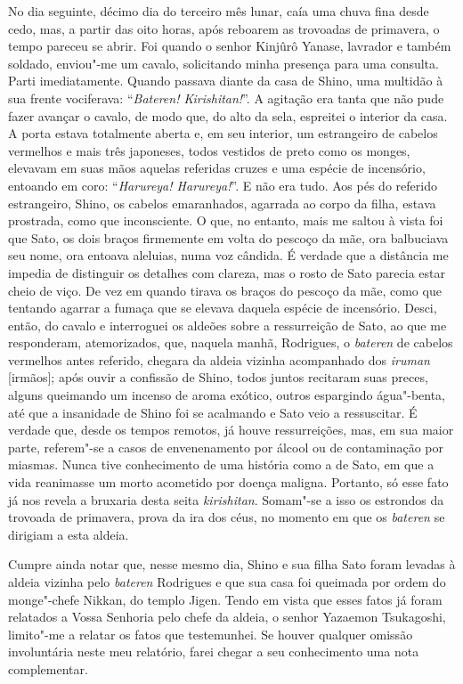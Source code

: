 No dia seguinte, décimo dia do terceiro mês lunar, caía uma chuva fina
desde cedo, mas, a partir das oito horas, após reboarem as trovoadas de
primavera, o tempo pareceu se abrir. Foi quando o senhor Kinjûrô Yanase, 
lavrador e também soldado, enviou"-me um cavalo, solicitando
minha presença para uma consulta. Parti imediatamente. Quando passava
diante da casa de Shino, uma multidão à sua frente vociferava:
``\textit{Bateren! Kirishitan!}''. A agitação era tanta que não pude
fazer avançar o cavalo, de modo que, do alto da sela, espreitei o
interior da casa. A porta estava totalmente aberta e, em seu interior,
um estrangeiro de cabelos vermelhos e mais três japoneses, todos
vestidos de preto como os monges, elevavam em suas mãos aquelas
referidas cruzes e uma espécie de incensório, entoando em coro:
``\textit{Harureya! Harureya!}''. E não era tudo. Aos pés do referido
estrangeiro, Shino, os cabelos emaranhados, agarrada ao corpo da filha,
estava prostrada, como que inconsciente. O que, no entanto, mais me
saltou à vista foi que Sato, os dois braços firmemente em volta do
pescoço da mãe, ora balbuciava seu nome, ora entoava aleluias, numa voz
cândida. É verdade que a distância me impedia de distinguir os detalhes
com clareza, mas o rosto de Sato parecia estar cheio de viço. De vez em
quando tirava os braços do pescoço da mãe, como que tentando agarrar a
fumaça que se elevava daquela espécie de incensório. Desci, então, do
cavalo e interroguei os aldeões sobre a ressurreição de Sato, ao que me
responderam, atemorizados, que, naquela manhã, Rodrigues, o
\textit{bateren} de cabelos vermelhos antes referido, chegara da aldeia
vizinha acompanhado dos \textit{iruman} [irmãos]; 
após ouvir a confissão de Shino, todos juntos recitaram
suas preces, alguns queimando um incenso de aroma exótico, outros
espargindo água"-benta, até que a insanidade de Shino foi se acalmando e
Sato veio a ressuscitar. É verdade que, desde os tempos remotos, já
houve ressurreições, mas, em sua maior parte, referem"-se a casos de
envenenamento por álcool ou de contaminação por miasmas. Nunca tive
conhecimento de uma história como a de Sato, em que a vida reanimasse
um morto acometido por doença maligna. Portanto, só esse fato já nos
revela a bruxaria desta seita \textit{kirishitan}. Somam"-se a isso os
estrondos da trovoada de primavera, prova da ira dos céus, no momento
em que os \textit{bateren} se dirigiam a esta aldeia.

Cumpre ainda notar que, nesse mesmo dia, Shino e sua filha Sato foram
levadas à aldeia vizinha pelo \textit{bateren} Rodrigues e que sua casa
foi queimada por ordem do monge"-chefe Nikkan, do templo Jigen. Tendo em
vista que esses fatos já foram relatados a Vossa Senhoria pelo chefe da
aldeia, o senhor Yazaemon Tsukagoshi, limito"-me a relatar os fatos que
testemunhei. Se houver qualquer omissão involuntária neste meu
relatório, farei chegar a seu conhecimento uma nota complementar.

